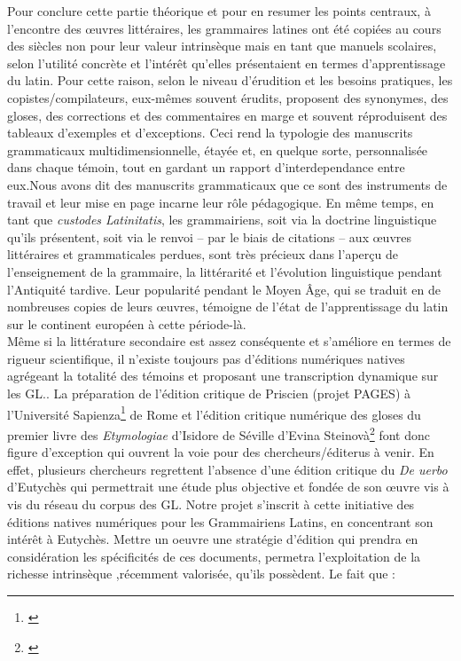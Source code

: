 \documentclass[a4paper, twoside, 12pt]{book}
\begin{document}
Pour conclure cette partie théorique et pour en resumer les points centraux, à l'encontre des œuvres littéraires, les grammaires latines ont été copiées au cours des siècles non pour leur \og{}valeur intrinsèque \fg{} mais en tant que manuels scolaires, selon l’utilité concrète et l’intérêt qu’elles présentaient en termes d’apprentissage du latin. Pour cette raison, selon le niveau d’érudition et les besoins pratiques, les copistes/compilateurs, eux-mêmes souvent érudits, proposent des synonymes, des gloses, des corrections et des commentaires en marge et souvent réproduisent des tableaux d'exemples et d'exceptions. Ceci rend la typologie des manuscrits grammaticaux multidimensionnelle, étayée et, en quelque sorte, personnalisée dans chaque témoin, tout en gardant un rapport d'interdependance entre eux.Nous avons dit des manuscrits grammaticaux que ce sont des instruments de travail et leur mise en page incarne leur rôle pédagogique. En même temps, en tant que \textit{custodes Latinitatis}, les grammairiens, soit via la doctrine linguistique qu’ils présentent, soit via le renvoi – par le biais de citations – aux œuvres littéraires et grammaticales perdues, sont très précieux dans l’aperçu de l’enseignement de la grammaire, la littérarité et l’évolution linguistique pendant l’Antiquité tardive. Leur popularité pendant le Moyen Âge, qui se traduit en de nombreuses copies de leurs œuvres, témoigne de l’état de l’apprentissage du latin sur le continent européen à cette période-là. \\

Même si la littérature secondaire est assez conséquente et s’améliore en termes de rigueur scientifique, il n’existe toujours pas d’éditions numériques natives agrégeant la totalité des témoins et proposant une transcription \og{} dynamique \fg{} sur les GL.. La préparation de l’édition critique de Priscien (projet PAGES) à l’Université Sapienza\footnote{\cite{monella2019digital}} de Rome et l'édition critique numérique des gloses du premier livre des \textit{Etymologiae} d'Isidore de Séville d'Evina Steinovà\footnote{\cite{steinova2021glosses}} font donc figure d’exception qui ouvrent la voie pour des chercheurs/éditerus à venir. En effet, plusieurs chercheurs regrettent l’absence d’une édition critique du \textit{De uerbo} d’Eutychès qui permettrait une étude plus objective et fondée de son œuvre vis à vis du réseau du corpus des GL. Notre projet s’inscrit à cette initiative des éditions natives numériques pour les Grammairiens Latins, en concentrant son intérêt à Eutychès. Mettre un oeuvre une stratégie d'édition qui prendra en considération les spécificités de ces documents, permetra l'exploitation de la richesse intrinsèque ,récemment valorisée, qu'ils possèdent. Le fait que :
\end{document}
